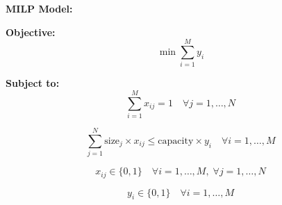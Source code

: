 \documentclass{article}
\begin{document}
\textbf{MILP Model:}

\textbf{Objective:}
\[
\min \sum_{i=1}^M y_i
\]

\textbf{Subject to:}
\[
\sum_{i=1}^M x_{ij} = 1 \quad \forall j = 1, \ldots, N
\]

\[
\sum_{j=1}^N \text{size}_j \times x_{ij} \leq \text{capacity} \times y_i \quad \forall i = 1, \ldots, M
\]

\[
x_{ij} \in \{0,1\} \quad \forall i = 1, \ldots, M, \; \forall j = 1, \ldots, N
\]

\[
y_i \in \{0,1\} \quad \forall i = 1, \ldots, M
\]
\end{document}

